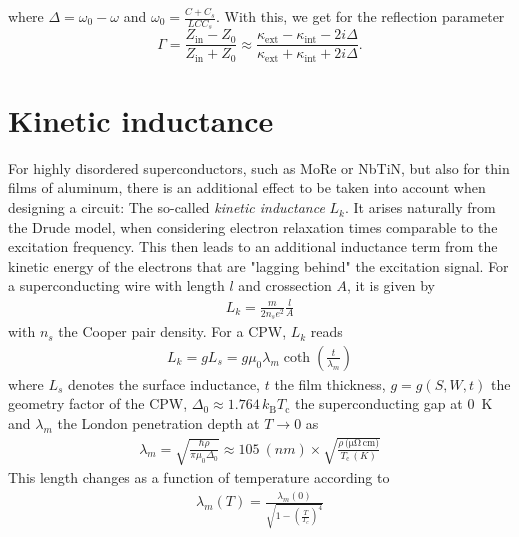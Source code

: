 where $\Delta=\omega_0-\omega$ and $\omega_0=\frac{C+C_s}{LCC_s}$. With this, we get for the reflection parameter
\begin{equation}
\Gamma = \frac{Z_\text{in}-Z_0}{Z_\text{in}+Z_0}\approx\frac{\kappa_\text{ext}-\kappa_\text{int}-2i\Delta}{\kappa_\text{ext}+\kappa_\text{int}+2i\Delta}.
\end{equation}

\section{Kinetic inductance}
For highly disordered superconductors, such as MoRe or NbTiN, but also for thin films of aluminum, there is an additional effect to be taken into account when designing a circuit: The so-called \textit{kinetic inductance} $L_k$. It arises naturally from the Drude model, when considering electron relaxation times comparable to the excitation frequency. This then leads to an additional inductance term from the kinetic energy of the electrons that are "lagging behind" the excitation signal. For a superconducting wire with length $l$ and crossection $A$, it is given by
\begin{eqnarray}
L_k = \frac{m}{2n_s e^2}\frac{l}{A}
\end{eqnarray}
with $n_s$ the Cooper pair density. For a CPW, $L_k$ reads
\begin{eqnarray}
L_k = g L_s = g\mu_0\lambda_m\coth\left(\frac{t}{\lambda_m}\right)
\end{eqnarray}
where $L_s$ denotes the surface inductance, $t$ the film thickness, $g=g(S,W,t)$ the geometry factor of the CPW, $\Delta_0\approx1.764\,k_\text{B}T_\text{c}$ the superconducting gap at \SI{0}{K} and $\lambda_m$ the London penetration depth at $T\rightarrow0$ as
\begin{eqnarray}
\lambda_m=\sqrt{\frac{\hbar\rho}{\pi\mu_0\Delta_0}}\approx\SI{105}{(nm)}\times\sqrt{\frac{\rho\si{\,(\micro\ohm\,\centi\metre)}}{T_\text{c} \si{\,(K)}}}
\end{eqnarray}
This length changes as a function of temperature according to
\begin{eqnarray}
\lambda_m(T) = \frac{\lambda_m(0)}{\sqrt{1-\left(\frac{T}{T_c}\right)^4}}
\end{eqnarray}